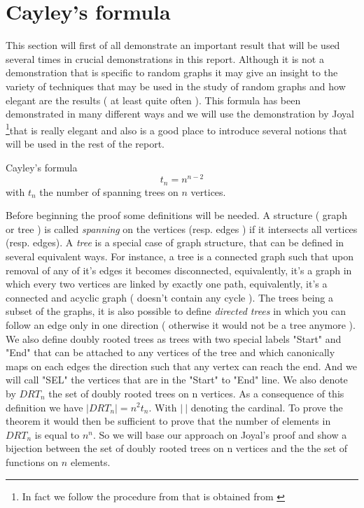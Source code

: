 \section{Cayley's formula}
This section will first of all demonstrate an important result that will be used several times in crucial demonstrations in this report. Although it is not a demonstration that is specific to random graphs it may give an insight to the variety of techniques that may be used in the study of random graphs and how elegant are the results ( at least quite often ). This formula has been demonstrated in many different ways and we will use the demonstration by Joyal \cite{joyal} \footnote{In fact we follow the procedure from \cite{JoyalProof} that is obtained from \cite{joyal} }that is really elegant and also is a good place to introduce several notions that will be used in the rest of the report. 
\begin{theorem}{Cayley's formula}\label{cayley}
\begin{equation}
    t_n = n^{n-2}
\end{equation}
with $t_n$ the number of spanning trees on $n$ vertices.
\end{theorem}
Before beginning the proof some definitions will be needed. A structure ( graph or tree ) is called \emph{spanning} on the vertices (resp. edges ) if it intersects all vertices (resp. edges). 
A \emph{tree} is a special case of graph structure, that can be defined in several equivalent ways. For instance, a tree is a connected graph such that upon removal of any of it's edges it becomes disconnected, equivalently, it's a graph in which every two vertices are linked by exactly one path, equivalently, it's a connected and acyclic graph ( doesn't contain any cycle ).
\newline 
The trees being a subset of the graphs, it is also possible to define \emph{directed trees} in which you can follow an edge only in one direction ( otherwise it would not be a tree anymore ).
We also define doubly rooted trees as trees with two special labels "Start" and "End" that can be attached to any vertices of the tree and which canonically maps on each edges the direction such that any vertex can reach the end. And we will call "SEL" the vertices that are in the "Start" to "End" line. 
We also denote by $DRT_n$ the set of doubly rooted trees on n vertices.
\newline
As a consequence of this definition we have $|DRT_n| = n^2 t_n$. With $|\ |$ denoting the cardinal. 
To prove the theorem it would then be sufficient to prove that the number of elements in $DRT_n$ is equal to $n^n$. So we will base our approach on Joyal's proof and show a bijection between the set of doubly rooted trees on n vertices and the the set of functions on $n$ elements.
